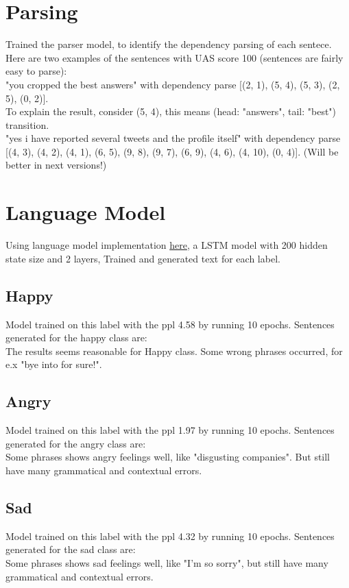\documentclass[a4paper]{article}
\begin{document}
\section{Parsing}
Trained the parser model, to identify the dependency parsing of each sentece. Here are two examples of the sentences with UAS score 100 (sentences are fairly easy to parse):\\
"you cropped the best answers" with dependency parse [(2, 1), (5, 4), (5, 3), (2, 5), (0, 2)].\\ 
To explain the result, consider (5, 4), this means (head: "answers", tail: "best") transition.\\
"yes i have reported several tweets and the profile itself" with dependency parse [(4, 3), (4, 2), (4, 1), (6, 5), (9, 8), (9, 7), (6, 9), (4, 6), (4, 10), (0, 4)]. (Will be better in next versions!)
\section{Language Model}
Using language model implementation \href{https://github.com/pytorch/examples}{here}, a LSTM model with 200 hidden state size and 2 layers, Trained and generated text for each label.
\subsection{Happy}
Model trained on this label with the ppl 4.58 by running 10 epochs. Sentences generated for the happy class are:\\

The results seems reasonable for Happy class. Some wrong phrases occurred, for e.x "bye into for sure!".\\
\subsection{Angry}
Model trained on this label with the ppl 1.97 by running 10 epochs. Sentences generated for the angry class are:\\

Some phrases shows angry feelings well, like "disgusting companies". But still have many grammatical and contextual errors.\\
\subsection{Sad}
Model trained on this label with the ppl 4.32 by running 10 epochs. Sentences generated for the sad class are:\\

Some phrases shows sad feelings well, like "I'm so sorry", but still have many grammatical and contextual errors.\pagebreak
\end{document}
